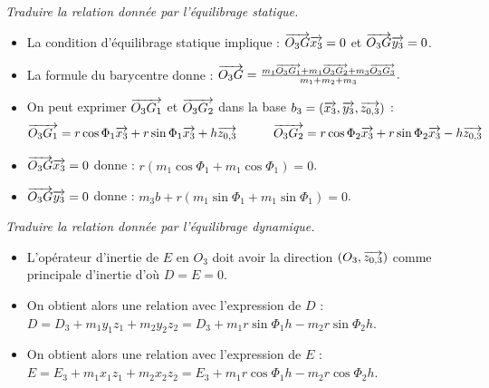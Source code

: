 \documentclass[10pt,fleqn]{article} %
\begin{document}
\begin{exemple}
 \textit{Traduire la relation donnée par l'équilibrage statique.}
\begin{itemize}
\item La condition d'équilibrage statique implique : $\overrightarrow{O_3G} \overrightarrow{x_3}=0$ et $\overrightarrow{O_3G} \overrightarrow{y_3}=0$.
\item La formule du barycentre donne : 
$
\overrightarrow{O_3G}=\frac{m_1 \overrightarrow{O_3G_1}+m_1 \overrightarrow{O_3G_2}+m_3 \overrightarrow{O_3G_3}}{m_1+m_2+m_3}.
$
\item On peut exprimer $\overrightarrow{O_3G_1}$ et $\overrightarrow{O_3G_2}$ dans la base $b_3=\left(\overrightarrow{{x_3}},\overrightarrow{{y}_3},\overrightarrow{{z}_{0,3}} \right)$ :
$$
\overrightarrow{O_3G_1}=r \cos\Phi_1 \overrightarrow{x_3}+r \sin\Phi_1 \overrightarrow{x_3}+h \overrightarrow{z_{0,3}}
\quad\quad\quad
\overrightarrow{O_3G_2}=r \cos\Phi_2 \overrightarrow{x_3}+r \sin\Phi_2 \overrightarrow{x_3}-h \overrightarrow{z_{0,3}}
$$

\item $\overrightarrow{O_3G} \overrightarrow{x_3}=0$ donne : 
$
r \left(m_1 \cos\Phi_1+m_1 \cos\Phi_1 \right)=0$.
\item $\overrightarrow{O_3G} \overrightarrow{y_3}=0$ donne : 
$
m_3 b+r \left(m_1 \sin\Phi_1+m_1 \sin\Phi_1 \right)=0
$.
\end{itemize}


\textit{Traduire la relation donnée par l'équilibrage dynamique.}

\begin{itemize}
\item L'opérateur d'inertie de $E$ en $O_3$ doit avoir la direction $\left(O_3,\overrightarrow{{z_{0,3}}}\right)$  comme principale d'inertie d'où $D=E=0$.
\item On obtient alors une relation avec l'expression de $D$ : 
$
D=D_3+m_1 y_1 z_1+ m_2 y_2 z_2=D_3+m_1 r \sin\Phi_1 h-m_2 r \sin\Phi_2 h
$.
\item On obtient alors une relation avec l'expression de $E$ :
$E=E_3+m_1 x_1 z_1+m_2 x_2 z_2=E_3+m_1 r \cos\Phi_1 h-m_2 r \cos\Phi_2 h
$.
\end{itemize}

\end{exemple}
\end{document}

